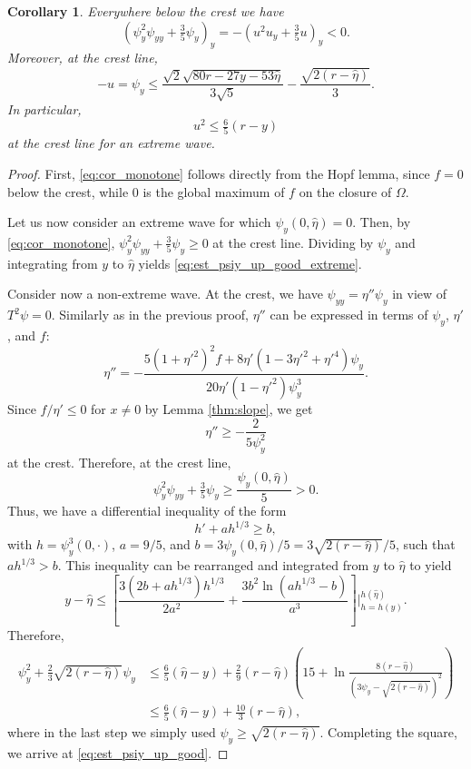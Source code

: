 \documentclass{amsart}
\newtheorem{corollary}[theorem]{Corollary}
\theoremstyle{definition}
\begin{document}
\begin{corollary}\label{cor:u_crestline}
	Everywhere below the crest we have
	\begin{equation}\label{eq:cor_monotone}
		(\psi_y^2 \psi_{yy}+\tfrac35 \psi_y)_y = -(u^2 u_y+\tfrac35 u)_y < 0.
	\end{equation}
	Moreover, at the crest line,
	\begin{equation}\label{eq:est_psiy_up_good}
		-u = \psi_y \le \frac{\sqrt2\sqrt{80r-27y-53\hat\eta}}{3\sqrt5} - \frac{\sqrt{2(r-\hat\eta)}}{3}.
	\end{equation}
	In particular,
	\begin{equation}\label{eq:est_psiy_up_good_extreme}
		u^2 \leq \tfrac65 (r-y)
	\end{equation}
	at the crest line for an extreme wave.
\end{corollary}
\begin{proof}
	First, \eqref{eq:cor_monotone} follows directly from the Hopf lemma, since $f = 0$ below the crest, while $0$ is the global maximum of $f$ on the closure of $\Omega$.
	
	Let us now consider an extreme wave for which $\psi_y(0,\hat\eta)=0$. Then, by \eqref{eq:cor_monotone}, $\psi_y^2 \psi_{yy}+\tfrac35 \psi_y\ge0$ at the crest line. Dividing by $\psi_y$ and integrating from $y$ to $\hat\eta$ yields \eqref{eq:est_psiy_up_good_extreme}.
	
	Consider now a non-extreme wave. At the crest, we have $\psi_{yy}=\eta''\psi_y$ in view of $T^2\psi=0$. Similarly as in the previous proof, $\eta''$ can be expressed in terms of $\psi_y$, $\eta'$, and $f$:
	\[\eta'' = -\frac{5(1+\eta'^2)^2 f + 8\eta' (1-3\eta'^2+\eta'^4)\psi_y}{20\eta' (1-\eta'^2) \psi_y^3}.\]
	Since $f/\eta'\le0$ for $x\ne0$ by Lemma \ref{thm:slope}, we get
	\[\eta'' \ge -\frac{2}{5\psi_y^2}\]
	at the crest. Therefore, at the crest line,
	\[\psi_y^2 \psi_{yy}+\tfrac35 \psi_y \ge \frac{\psi_y(0,\hat\eta)}{5} > 0.\]
	Thus, we have a differential inequality of the form
	\[h' + ah^{1/3} \ge b,\]
	with $h=\psi_y^3(0,\cdot)$, $a=9/5$, and $b=3\psi_y(0,\hat\eta)/5=3\sqrt{2(r-\hat\eta)}/5$, such that $ah^{1/3}>b$. This inequality can be rearranged and integrated from $y$ to $\hat\eta$ to yield
	\[y-\hat\eta \le \left[\frac{3(2b+ah^{1/3})h^{1/3}}{2a^2} + \frac{3b^2\ln(ah^{1/3}-b)}{a^3}\right]\Bigg|_{h=h(y)}^{h(\hat\eta)}.\]
	Therefore,
	\begin{align*}
		\psi_y^2 + \tfrac23 \sqrt{2(r-\hat\eta)}\psi_y &\le \tfrac65 (\hat\eta-y) + \tfrac29 (r-\hat\eta) \left(15 + \ln\frac{8(r-\hat\eta)}{\left(3\psi_y-\sqrt{2(r-\hat\eta)}\right)^2}\right)\\
		&\le \tfrac65 (\hat\eta-y) + \tfrac{10}{3} (r-\hat\eta),
	\end{align*}
	where in the last step we simply used $\psi_y\ge\sqrt{2(r-\hat\eta)}$. Completing the square, we arrive at \eqref{eq:est_psiy_up_good}.
\end{proof}
\end{document}
